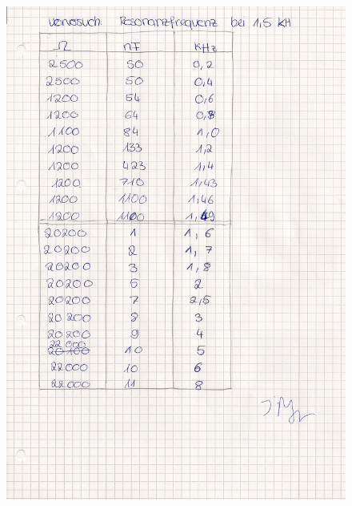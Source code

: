 \documentclass[fontsize=12pt]{scrartcl}
\begin{document}
\begin{figure}[h]
\vspace{-20pt}
\includegraphics[scale=0.3]{Graphik/Linda}
\end{figure}
\end{document}

